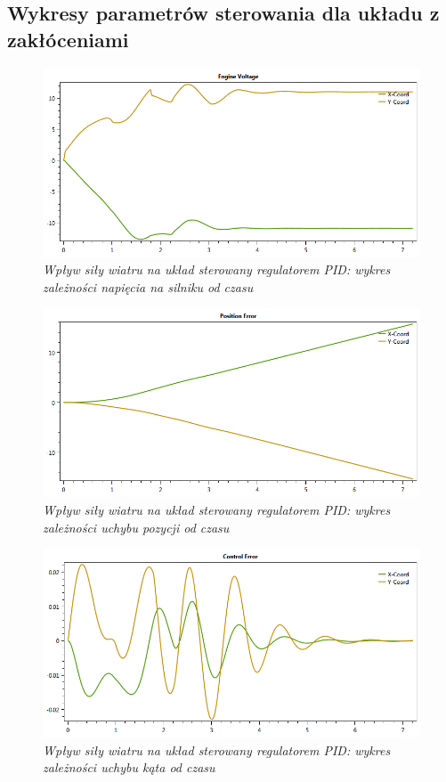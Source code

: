 \documentclass[12pt, oneside]{report}
\theoremstyle{definition}
\begin{document}
\begin{appendices}
  \chapter{Wykresy parametrów sterowania dla układu z zakłóceniami}
\label{appendix:B}
\begin{figure}[H]
	\centering
		\includegraphics[width = 400pt]{WindPIDEV} 
		\caption{\textit{Wpływ siły wiatru na układ sterowany regulatorem PID: wykres zależności napięcia na silniku od czasu}}
		\label{plot:WindPIDEV}
\end{figure}

\begin{figure}[H]
	\centering
		\includegraphics[width = 400pt]{WindPIDCEP} 
		\caption{\textit{Wpływ siły wiatru na układ sterowany regulatorem PID: wykres zależności uchybu pozycji od czasu}}
		\label{plot:WindPIDCEP}
\end{figure}

\begin{figure}[H]
	\centering
		\includegraphics[width = 400pt]{WindPIDCEA} 
		\caption{\textit{Wpływ siły wiatru na układ sterowany regulatorem PID: wykres zależności uchybu kąta od czasu}}
		\label{plot:WindPIDCEA}
\end{figure}

  
\end{appendices}
\end{document}

